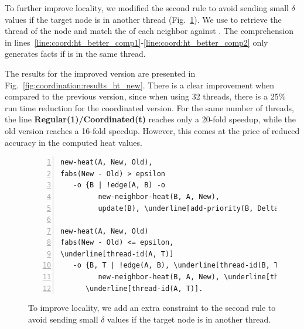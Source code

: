 To further improve locality, we modified the second rule to avoid sending small
$\delta$ values if the target node is in another thread
(Fig.~\ref{code:coord:ht_better}). We use  to retrieve the
thread  of the node  and match the  of each
neighbor  against . The comprehension in
lines~\ref{line:coord:ht_better_comp1}-\ref{line:coord:ht_better_comp2} only
generates  facts if  is in the same thread.

The results for the improved version are presented in
Fig.~\ref{fig:coordination:results_ht_new}. There is a clear improvement when
compared to the previous version, since when using 32 threads, there is a 25\%
run time reduction for the coordinated version. For the same number of threads,
the line \textbf{Regular(1)/Coordinated(t)} reaches only a 20-fold speedup,
while the old version reaches a 16-fold speedup. However, this comes at the
price of reduced accuracy in the computed heat values.

\begin{figure}[h!]
\begin{Verbatim}[numbers=left,fontsize=\codesize,commandchars=\\\[\]]
new-heat(A, New, Old),
fabs(New - Old) > epsilon
   -o {B | !edge(A, B) -o
         new-neighbor-heat(B, A, New),
         update(B), \underline[add-priority(B, Delta)]}.

new-heat(A, New, Old)
fabs(New - Old) <= epsilon,
\underline[thread-id(A, T)]
   -o {B, T | !edge(A, B), \underline[thread-id(B, T)] -o\label[line:coord:ht_better_comp1]
         new-neighbor-heat(B, A, New), \underline[thread-id(B, T)]},\label[line:coord:ht_better_comp2]
      \underline[thread-id(A, T)].
\end{Verbatim}

  \caption{To improve locality, we add an extra constraint to the second rule to
     avoid sending small $\delta$ values if the target node is in another thread.}
  \label{code:coord:ht_better}
\end{figure}

